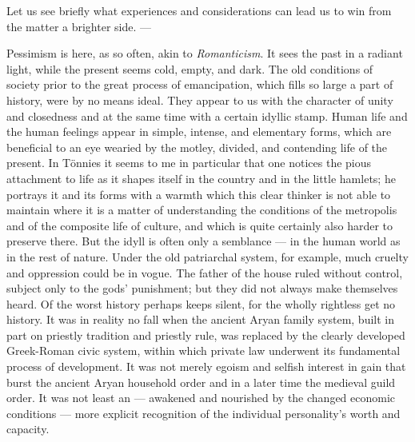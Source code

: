 \documentclass[12pt,a4paper,openany]{book}
\newcommand{\opage}[1]{\marginnote{\footnotesize\textit{[#1]}}}
\begin{document}
Let us see briefly what experiences and considerations
can lead us to win from the matter a brighter side. ---

Pessimism is here, as so often, akin to
\emph{Romanticism}. It sees the past in a radiant light, while
the present seems cold, empty, and dark. The old conditions of society
prior to the great process of emancipation, which fills so
large a part of history, were by no means ideal. They
appear to us with the character of unity and closedness
and at the same time with a certain idyllic stamp. Human life and the
human feelings appear in simple, intense, and
elementary forms, which are beneficial to an eye wearied by the motley,
divided, and contending life of the present. In Tönnies
it seems to me in particular that one notices the pious
attachment to life as it shapes itself in the country and in the
little hamlets; he portrays it and its forms with a
warmth which this clear thinker is not able to
maintain where it is a matter of understanding the conditions of the metropolis and of the
composite life of culture, and which is quite certainly
also harder to preserve there. But the idyll is often only
a semblance --- in the human world as in the rest of
nature. Under the old patriarchal system, for example,
much cruelty and oppression could be in vogue.
The father of the house ruled without control, subject only to the gods'
punishment; but they did not always make themselves heard. Of the worst
history perhaps keeps silent, for the wholly rightless get no
history. It was in reality no fall when the
ancient Aryan family system, built in part on priestly tradition and
priestly rule, was replaced by the clearly developed
\opage{150}Greek-Roman civic system, within which private law
underwent its fundamental process of development. It was not
merely egoism and selfish interest in gain that burst the
ancient Aryan household order and in a later time the
medieval guild order. It was not least an --- awakened and nourished
by the changed economic conditions --- more explicit
recognition of the individual personality's worth and capacity.
\end{document}
